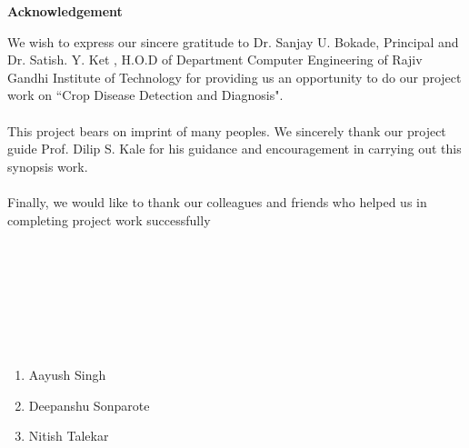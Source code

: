 \newpage
\thispagestyle{empty}
\vspace*{0.2cm}
\vspace{1cm}
\begin{center}
 \large\textbf{Acknowledgement}
\end{center}
\vspace{2cm}
\hspace{2cm}We wish to express our sincere gratitude to Dr. Sanjay U. Bokade, Principal and Dr. Satish. Y. Ket , H.O.D of Department Computer Engineering of Rajiv Gandhi Institute of Technology for providing us an opportunity to do our project work on “Crop Disease Detection and Diagnosis".\\ 
\\
This project bears on imprint of many peoples. We sincerely thank our project guide Prof. Dilip S. Kale for his guidance and encouragement in carrying out this synopsis work.\\  
\\
Finally, we would like to thank our colleagues and friends who helped us in completing project work successfully
\\
\\
\\
\\ 
\\
\\
\\
\\

\begin{enumerate}
\item \begin{flushright}Aayush Singh\end{flushright}
\item \begin{flushright}Deepanshu Sonparote\end{flushright}
\item \begin{flushright}Nitish Talekar\end{flushright}
\end{enumerate}

\newpage

